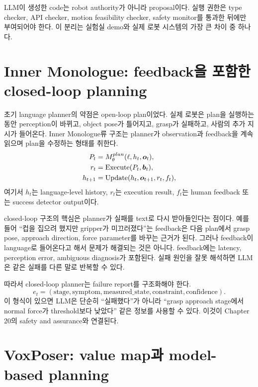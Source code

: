 \begin{tcolorbox}[title={Engineering note: generated code is an interface, not authority}]
LLM이 생성한 code는 robot authority가 아니라 proposal이다. 실행 권한은 type checker, API checker, motion feasibility checker, safety monitor를 통과한 뒤에만 부여되어야 한다. 이 분리는 실험실 demo와 실제 로봇 시스템의 가장 큰 차이 중 하나다.
\end{tcolorbox}

\section{Inner Monologue: feedback을 포함한 closed-loop planning}

초기 language planner의 약점은 open-loop plan이었다. 실제 로봇은 plan을 실행하는 동안 perception이 바뀌고, object pose가 틀어지고, grasp가 실패하고, 사람의 추가 지시가 들어온다. Inner Monologue류 구조는 planner가 observation과 feedback을 계속 읽으며 plan을 수정하는 형태를 취한다.
\begin{align}
  P_t &= M_{\theta}^{plan}(\ell,h_t,\bm{o}_t), \\
  r_t &= \mathrm{Execute}(P_t,\bm{b}_t), \\
  h_{t+1} &= \mathrm{Update}(h_t,\bm{o}_{t+1},r_t,f_t),
  \label{eq:inner-monologue-loop}
\end{align}
여기서 $h_t$는 language-level history, $r_t$는 execution result, $f_t$는 human feedback 또는 success detector output이다.

closed-loop 구조의 핵심은 planner가 실패를 text로 다시 받아들인다는 점이다. 예를 들어 ``컵을 집으려 했지만 gripper가 미끄러졌다''는 feedback은 다음 plan에서 grasp pose, approach direction, force parameter를 바꾸는 근거가 된다. 그러나 feedback이 language로 들어온다고 해서 문제가 해결되는 것은 아니다. feedback에는 latency, perception error, ambiguous diagnosis가 포함된다. 실패 원인을 잘못 해석하면 LLM은 같은 실패를 다른 말로 반복할 수 있다.

따라서 closed-loop planner는 failure report를 구조화해야 한다.
\begin{equation}
  e_t
  =
  (\mathrm{stage},\mathrm{symptom},\mathrm{measured\_state},
  \mathrm{constraint},\mathrm{confidence}).
  \label{eq:failure-report}
\end{equation}
이 형식이 있으면 LLM은 단순히 ``실패했다''가 아니라 ``grasp approach stage에서 normal force가 threshold보다 낮았다'' 같은 정보를 사용할 수 있다. 이것이 Chapter 20의 safety and assurance와 연결된다.

\section{VoxPoser: value map과 model-based planning}

